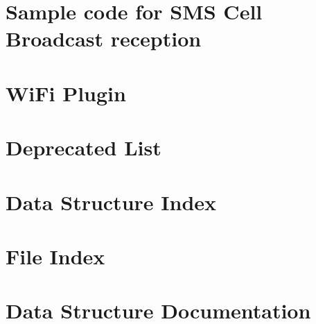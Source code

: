 \documentclass[twoside]{book}
\newcommand{\+}{\discretionary{\mbox{\scriptsize$\hookleftarrow$}}{}{}}
\begin{document}
\chapter{Sample code for S\+MS Cell Broadcast reception}
\label{c_smsCbSample}
\hypertarget{c_smsCbSample}{}

\chapter{Wi\+Fi Plugin}
\label{external_proj_mainpage}
\hypertarget{external_proj_mainpage}{}

\chapter{Deprecated List}
\label{deprecated}
\hypertarget{deprecated}{}

\chapter{Data Structure Index}

\chapter{File Index}

\chapter{Data Structure Documentation}







\end{document}
